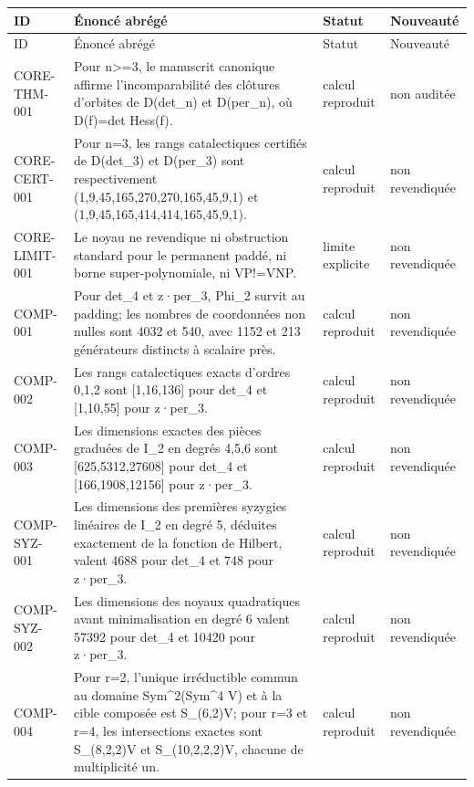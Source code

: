\begin{longtable}{@{}>{\raggedright\arraybackslash}p{1.6cm}>{\raggedright\arraybackslash}p{8.4cm}>{\raggedright\arraybackslash}p{2.5cm}>{\raggedright\arraybackslash}p{2.0cm}@{}}
\toprule
ID & Énoncé abrégé & Statut & Nouveauté \\
\midrule
\endfirsthead
\toprule ID & Énoncé abrégé & Statut & Nouveauté \\ \midrule
\endhead
CORE-THM-001 & Pour n>=3, le manuscrit canonique affirme l'incomparabilité des clôtures d'orbites de D(det\_n) et D(per\_n), où D(f)=det Hess(f). & calcul reproduit & non auditée \\
CORE-CERT-001 & Pour n=3, les rangs catalectiques certifiés de D(det\_3) et D(per\_3) sont respectivement (1,9,45,165,270,270,165,45,9,1) et (1,9,45,165,414,414,165,45,9,1). & calcul reproduit & non revendiquée \\
CORE-LIMIT-001 & Le noyau ne revendique ni obstruction standard pour le permanent paddé, ni borne super-polynomiale, ni VP!=VNP. & limite explicite & non revendiquée \\
COMP-001 & Pour det\_4 et z·per\_3, Phi\_2 survit au padding; les nombres de coordonnées non nulles sont 4032 et 540, avec 1152 et 213 générateurs distincts à scalaire près. & calcul reproduit & non revendiquée \\
COMP-002 & Les rangs catalectiques exacts d'ordres 0,1,2 sont [1,16,136] pour det\_4 et [1,10,55] pour z·per\_3. & calcul reproduit & non revendiquée \\
COMP-003 & Les dimensions exactes des pièces graduées de I\_2 en degrés 4,5,6 sont [625,5312,27608] pour det\_4 et [166,1908,12156] pour z·per\_3. & calcul reproduit & non revendiquée \\
COMP-SYZ-001 & Les dimensions des premières syzygies linéaires de I\_2 en degré 5, déduites exactement de la fonction de Hilbert, valent 4688 pour det\_4 et 748 pour z·per\_3. & calcul reproduit & non revendiquée \\
COMP-SYZ-002 & Les dimensions des noyaux quadratiques avant minimalisation en degré 6 valent 57392 pour det\_4 et 10420 pour z·per\_3. & calcul reproduit & non revendiquée \\
COMP-004 & Pour r=2, l'unique irréductible commun au domaine Sym\textasciicircum{}2(Sym\textasciicircum{}4 V) et à la cible composée est S\_(6,2)V; pour r=3 et r=4, les intersections exactes sont S\_(8,2,2)V et S\_(10,2,2,2)V, chacune de multiplicité un. & calcul reproduit & non revendiquée \\

\end{longtable}
